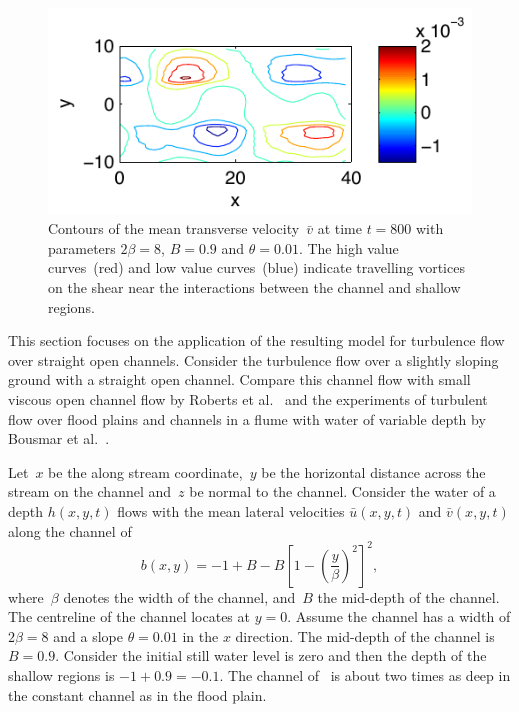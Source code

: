 \documentclass[twocolumn]{afmc_art}
\newcommand{\uu}{{\bar u}}
\newcommand{\vv}{{\bar v}}
\begin{document}
\begin{figure}
\centering
\includegraphics[scale=0.8]{straight-velocity-vc}
\caption{Contours of the mean transverse velocity~$\vv$ at time $t=800$ with parameters $2\beta=8$, $B=0.9$ and $\theta=0.01$. 
The high value curves~(red) and low value curves~(blue) indicate travelling vortices on the shear near the interactions between the channel and shallow regions. }
\label{straight-velocity-vc}
\end{figure}%

This section focuses on the application of the resulting model for turbulence flow over straight open channels. 
Consider the turbulence flow over a slightly sloping ground with a straight open channel. 
Compare this channel flow with small viscous open channel flow by Roberts et al.~\cite{Robertsli2006} and the experiments of turbulent flow over flood plains and channels in a flume with water of variable depth by Bousmar et al.~\cite{Bousmar2002,Bousmar2003a}. 
 
 Let~$x$ be the along stream coordinate,~$y$ be the horizontal distance across the stream on the channel and~$z$ be normal to the channel. 
Consider the water of a depth $h(x,y,t)$ flows with the mean lateral velocities $\uu(x,y,t)$ and $\vv(x,y,t)$ along the channel of
\begin{equation}
b(x,y)=-1+B-B\left[1-\left(\frac{y}{\beta}\right)^2\right]^2,\label{bed:straight}
\end{equation}
where~$\beta$ denotes the width of the channel, and~$B$ the mid-depth of the channel.  
The centreline of the channel locates at $y=0$.
Assume the channel has a width of  $2\beta=8$ and a slope $\theta=0.01$ in the $x$ direction.  
The mid-depth of the channel is $B=0.9$.
Consider the initial still water level is zero and then the depth of the shallow regions is $-1+0.9=-0.1$.
The channel of~\cite{Bousmar2002} is about two times as deep in the constant channel as in the flood plain.
\end{document}
